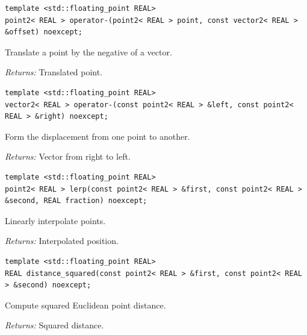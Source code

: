 \par\noindent\begin{minipage}{\linewidth}
\begin{lstlisting}[style=apireference]
template <std::floating_point REAL>
point2< REAL > operator-(point2< REAL > point, const vector2< REAL > &offset) noexcept;
\end{lstlisting}
{\footnotesize Translate a point by the negative of a vector.\par}
{\footnotesize\textit{Returns:} Translated point.\par}
\end{minipage}\par\vspace{1pt}
\par\noindent\begin{minipage}{\linewidth}
\begin{lstlisting}[style=apireference]
template <std::floating_point REAL>
vector2< REAL > operator-(const point2< REAL > &left, const point2< REAL > &right) noexcept;
\end{lstlisting}
{\footnotesize Form the displacement from one point to another.\par}
{\footnotesize\textit{Returns:} Vector from right to left.\par}
\end{minipage}\par\vspace{1pt}
\par\noindent\begin{minipage}{\linewidth}
\begin{lstlisting}[style=apireference]
template <std::floating_point REAL>
point2< REAL > lerp(const point2< REAL > &first, const point2< REAL > &second, REAL fraction) noexcept;
\end{lstlisting}
{\footnotesize Linearly interpolate points.\par}
{\footnotesize\textit{Returns:} Interpolated position.\par}
\end{minipage}\par\vspace{1pt}
\par\noindent\begin{minipage}{\linewidth}
\begin{lstlisting}[style=apireference]
template <std::floating_point REAL>
REAL distance_squared(const point2< REAL > &first, const point2< REAL > &second) noexcept;
\end{lstlisting}
{\footnotesize Compute squared Euclidean point distance.\par}
{\footnotesize\textit{Returns:} Squared distance.\par}
\end{minipage}\par\vspace{1pt}
